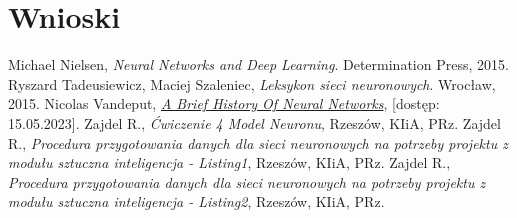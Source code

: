 \documentclass{article}
\begin{document}
\section{Wnioski}
\begin{thebibliography}{9}
    Michael Nielsen,
    \emph{Neural Networks and Deep Learning}.
    Determination Press,
    2015.
    Ryszard Tadeusiewicz, Maciej Szaleniec,
    \emph{Leksykon sieci neuronowych}.
    Wrocław,
    2015.
    Nicolas Vandeput,
    \href{https://medium.com/analytics-vidhya/a-brief-history-of-neural-networks-c234639a43f1}{\emph{A Brief History Of Neural Networks}},
    [dostęp: 15.05.2023].
    Zajdel R.,
    \emph{Ćwiczenie 4 Model Neuronu},
    Rzeszów,
    KIiA, PRz.
    Zajdel R.,
    \emph{Procedura przygotowania danych dla sieci neuronowych na potrzeby projektu z modułu sztuczna inteligencja - Listing1},
    Rzeszów,
    KIiA, PRz.
    Zajdel R.,
    \emph{Procedura przygotowania danych dla sieci neuronowych na potrzeby projektu z modułu sztuczna inteligencja - Listing2},
    Rzeszów,
    KIiA, PRz.
\end{thebibliography}
\end{document}
